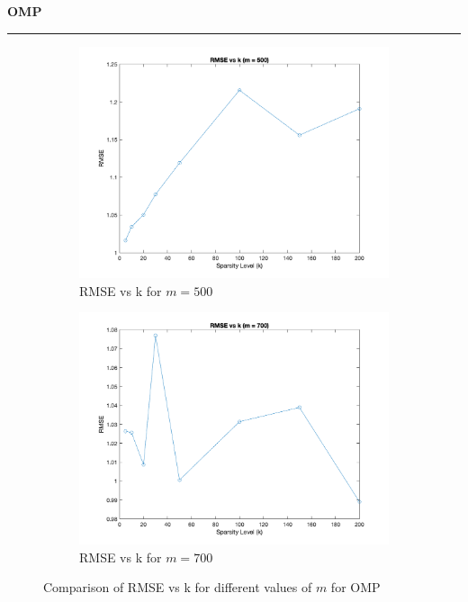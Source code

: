 \documentclass[a4paper,12pt]{article}
\newenvironment{solution}[2][]{%
    \begin{mdframed}[linecolor=blue!70!black, linewidth=2pt, roundcorner=10pt, backgroundcolor=yellow!10!white, skipabove=12pt, skipbelow=12pt]%
        \textbf{\large #2}
        \par\noindent\rule{\textwidth}{0.4pt}
}{
    \end{mdframed}
}
\begin{document}
\begin{solution}{OMP}
\begin{figure}[H]
  \centering
  \begin{subfigure}[t]{0.32\textwidth}
      \centering
      \includegraphics[width=\textwidth]{../images/omp/RMSE_vs_k_m_500.png}
      \caption{RMSE vs k for $m = 500$}
  \end{subfigure}
  \begin{subfigure}[t]{0.32\textwidth}
      \centering
      \includegraphics[width=\textwidth]{../images/omp/RMSE_vs_k_m_700.png}
      \caption{RMSE vs k for $m = 700$}
  \end{subfigure}
  \caption{Comparison of RMSE vs k for different values of $m$ for OMP}
  \label{fig:rmse_comparison2}
\end{figure}



\end{solution}
\end{document}
